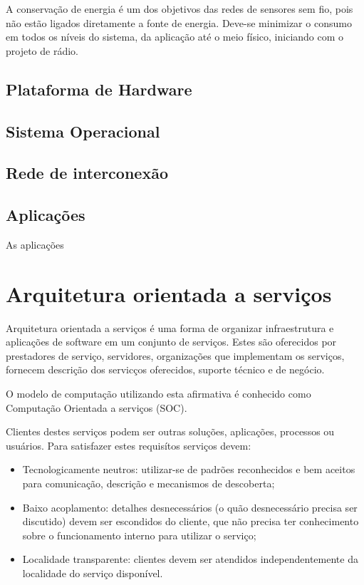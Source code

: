 A conserva\c{c}\~ao de energia \'e um dos objetivos das redes de sensores sem fio, pois n\~ao est\~ao ligados diretamente a fonte de energia. Deve-se minimizar o consumo em todos os n\'iveis do sistema, da aplica\c{c}\~ao at\'e o meio f\'isico, iniciando com o projeto de r\'adio. \cite{WsnSurvey2008} 

\subsection{Plataforma de Hardware}

\subsection{Sistema Operacional}

\subsection{Rede de interconex\~ao}

\subsection{Aplica\c{c}\~oes}

As aplica\c{c}\~oes 

\section{Arquitetura orientada a servi\c{c}os}

Arquitetura orientada a servi\c{c}os \'e uma forma de organizar infraestrutura e aplica\c{c}\~oes de software em um conjunto de servi\c{c}os. Estes s\~ao oferecidos por prestadores de servi\c{c}o, servidores, organiza\c{c}\~oes que implementam os servi\c{c}os, fornecem descri\c{c}\~ao dos servic\c{c}os oferecidos, suporte t\'ecnico e de neg\'ocio.

O modelo de computa\c{c}\~ao utilizando esta afirmativa \'e conhecido como Computa\c{c}\~ao Orientada a servi\c{c}os (SOC). \cite{581580}

Clientes destes servi\c{c}os podem ser outras solu\c{c}\~oes, aplica\c{c}\~oes, processos ou usu\'arios. Para satisfazer estes requis\'itos servi\c{c}os devem:
\begin{itemize}
\item Tecnologicamente neutros: utilizar-se de padr\~oes reconhecidos e bem aceitos para comunica\c{c}\~ao, descri\c{c}\~ao e mecanismos de descoberta;
\item Baixo acoplamento: detalhes desnecess\'arios (o qu\~ao desnecess\'ario precisa ser discutido) devem ser escondidos do cliente, que n\~ao precisa ter conhecimento sobre o funcionamento interno para utilizar o servi\c{c}o;
\item Localidade transparente: clientes devem ser atendidos independentemente da localidade do servi\c{c}o dispon\'ivel.
\end{itemize}

